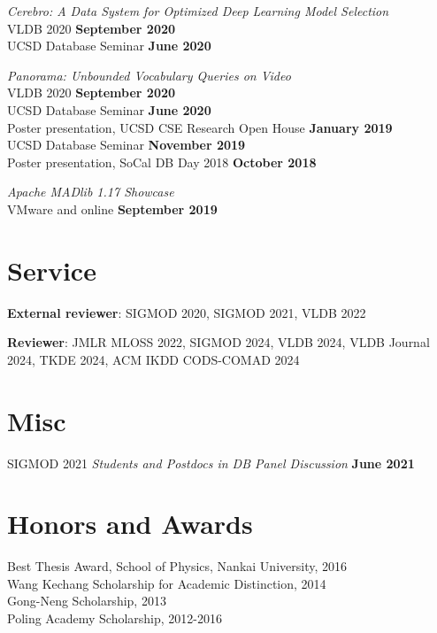 \documentclass[margin,line]{res}
\begin{document}
\begin{resume}
\vspace{-3mm}
\textit{Cerebro: A Data System for Optimized Deep Learning Model Selection}\\
VLDB 2020 \hfill {\bf September 2020}\\
UCSD Database Seminar \hfill {\bf June 2020}

\vspace{-3mm}
\textit{Panorama: Unbounded Vocabulary Queries on Video}\\
VLDB 2020 \hfill {\bf September 2020}\\
UCSD Database Seminar \hfill {\bf June 2020}\\
Poster presentation, UCSD CSE Research Open House \hfill {\bf January 2019}\\
UCSD Database Seminar \hfill {\bf November 2019}\\
Poster presentation, SoCal DB Day 2018 \hfill {\bf October 2018}

\vspace{-3mm}
\textit{Apache MADlib 1.17 Showcase}\\
VMware and online \hfill {\bf September 2019}\\


\section{\sc Service}

\textbf{External reviewer}: SIGMOD 2020, SIGMOD 2021, VLDB 2022

\textbf{Reviewer}: JMLR MLOSS 2022, SIGMOD 2024, VLDB 2024, VLDB Journal 2024, TKDE 2024, ACM IKDD CODS-COMAD 2024


\section{\sc Misc}

SIGMOD 2021 \textit{Students and Postdocs in DB Panel Discussion} \hfill {\bf June 2021}


\section{\sc Honors and Awards} 
Best Thesis Award, School of Physics, Nankai University, 2016\\
Wang Kechang Scholarship for Academic Distinction, 2014\\
Gong-Neng Scholarship, 2013\\
Poling Academy Scholarship, 2012-2016



\end{resume}
\end{document}
